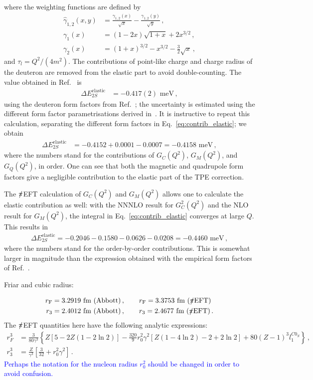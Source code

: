 \documentclass[prl,
twocolumn,
showpacs,preprintnumbers,amsmath,amssymb,
superscriptaddress,
a4paper,nofootinbib,longbibliography]{revtex4-2}
\def\piEFT/{$\slashed{\pi}$EFT}
\begin{document}
where the weighting functions are defined by
\begin{align}
\hat{\gamma}_{1,2}(x,y) & = \frac{\gamma_{1,2}(x)}{\sqrt{x}}-\frac{\gamma_{1,2}(y)}{\sqrt{y}}\,,\\
\gamma_1(x) & = (1-2x)\sqrt{1+x}+2x^{3/2}\,,\\
\gamma_2(x) & = (1+x)^{3/2}-x^{3/2} -\frac{3}{2}\sqrt{x}\,,
\end{align}
and $\tau_l=Q^2/(4m^2)$. The contributions of point-like charge and charge radius of the deuteron
are removed from the elastic part to avoid double-counting. The value obtained in Ref.~\cite{Carlson:2013xea} is
\begin{align}
    \Delta E_{2S}^\mathrm{elastic} & = -0.417(2) \text{ meV}\,,
\end{align}
using the deuteron form factors from Ref.~\cite{Abbott:2000ak}; the uncertainty is estimated using the different form factor parametrisations derived in~\cite{Abbott:2000ak}. It is instructive to repeat this calculation, separating the different form factors in Eq.~\eqref{eq:contrib_elastic}; we obtain
\begin{align}
    \Delta E_{2S}^\mathrm{elastic} & = -0.4152 + 0.0001-0.0007 = -0.4158\text{ meV}\,,
\end{align}
where the numbers stand for the contributions of $G_C(Q^2)$, $G_M(Q^2)$, and $G_Q(Q^2)$, in order. One can see that both the magnetic and quadrupole form factors give a negligible contribution to the elastic part of the TPE correction. 

The \piEFT/ calculation of $G_C(Q^2)$ and $G_M(Q^2)$ allows one to calculate the elastic contribution as well: with the NNNLO result for $G_C^2(Q^2)$ and the NLO result for $G_M(Q^2)$, the integral in Eq.~\eqref{eq:contrib_elastic} converges at large $Q$. This results in
\begin{align}
    \Delta E_{2S}^\mathrm{elastic}=-0.2046-0.1580-0.0626-0.0208 = -0.4460 \text{ meV}\,,
\end{align}
where the numbers stand for the order-by-order contributions. This is somewhat larger in magnitude than the expression obtained with the empirical form factors of Ref.~\cite{Abbott:2000ak}.

Friar and cubic radius:

\begin{align}
    r_\mathrm{F} &= 3.2919\text{ fm (Abbott)}\,,\qquad r_\mathrm{F} = 3.3753\text{ fm (\piEFT/)}\\
    r_3          &= 2.4012\text{ fm (Abbott)}\,,\qquad r_3          = 2.4677\text{ fm (\piEFT/)}\,.
\end{align}
The \piEFT/ quantities here have the following analytic expressions:
\begin{align}
    r_F^3 & = \frac{3}{80\gamma^3}\left\{
    Z \left[5 - 2 Z (1-2\ln 2)\right]-\frac{320}{9} r_0^2\gamma ^2 \left[Z(1-4\ln 2)-2+2\ln 2\right]
    +
    80 (Z-1)^3 l_1^{C0_S}\right\}\,, \\
    r_3^3 & = \frac{Z}{\gamma^3}\left[\frac{3}{32}+r_0^2\gamma^2\right]\,.
\end{align}
\textcolor{blue}{Perhaps the notation for the nucleon radius $r_0^2$ should be changed in order to avoid confusion.}
\end{document}
